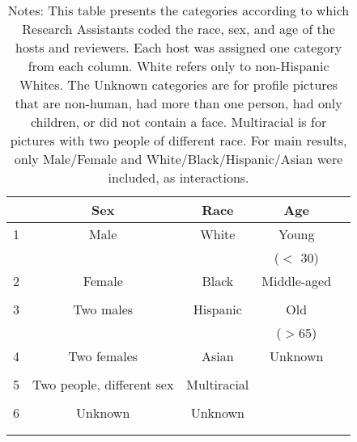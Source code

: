 {
\def\sym#1{\ifmmode^{#1}\else\(^{#1}\)\fi}
\begin{longtable}{l*{4}{c}}
\caption{Coding categories}\\
\hline\hline\endfirsthead\hline\endhead\hline\endfoot\endlastfoot
                    &\multicolumn{1}{c}{Sex}&\multicolumn{1}{c}{Race}&\multicolumn{1}{c}{Age}\\
\hline

1          &           Male         &           White         &           Young      \\ 
                    &                 &                  &          ($<$ 30)      \\
[1em]
2        &      Female  &      Black  &       Middle-aged     \\
                    &              &              &         \\
[1em]
3    &       Two males        &      Hispanic &       Old    \\
                    &              &              &     ($>$65)       \\
[1em]
4          &      Two females        &      Asian         &     Unknown      \\
                    &              &              &          \\
[1em]
5        &      Two people, different sex         &      Multiracial         &       \\
                    &              &              &       \\
[1em]
6    &       Unknown        &       Unknown  &        \\
                    &             &              &             \\
\hline\hline

\caption*{Notes: This table presents the categories according to which Research Assistants coded the race, sex, and age of the hosts and reviewers. Each host was assigned one category from each column. White refers only to non-Hispanic Whites. The Unknown categories are for profile pictures that are non-human, had more than one person, had only children, or did not contain a face. Multiracial is for pictures with two people of different race. For main results, only Male/Female and White/Black/Hispanic/Asian were included, as interactions.}
\label{Table 1}


\end{longtable}
}
